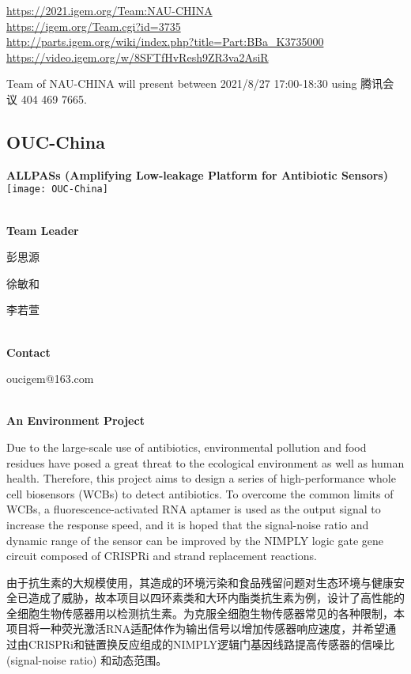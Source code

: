 \url{https://2021.igem.org/Team:NAU-CHINA }\\
\url{https://igem.org/Team.cgi?id=3735 }\\
\url{http://parts.igem.org/wiki/index.php?title=Part:BBa_K3735000 }\\
\url{https://video.igem.org/w/8SFTfHvResh9ZR3va2AsiR }\\

\vfill{}









Team of NAU-CHINA will present between   2021/8/27 17:00-18:30      using 腾讯会议 404 469 7665.
\newpage


\subsection{\textcolor{Blu}{ OUC-China } }
\vspace{5mm}
\begin{center}
\large{
  \textbf{ ALLPASs (Amplifying Low-leakage Platform for Antibiotic Sensors) }\\
  \texttt{[image: OUC-China]}
}
\end{center}
\textbf{\\Team Leader}

  彭思源

  徐敏和

  李若萱


\textbf{\\Contact}

  oucigem@163.com

\textbf{\\An Environment Project\\}\begin{spacing}{1.5}

Due to the large-scale use of antibiotics, environmental pollution and food residues have posed a great threat to the ecological environment as well as human health. Therefore, this project aims to design a series of high-performance whole cell biosensors (WCBs) to detect antibiotics. To overcome the common limits of WCBs, a fluorescence-activated RNA aptamer is used as the output signal to increase the response speed, and it is hoped that the signal-noise ratio and dynamic range of the sensor can be improved by the NIMPLY logic gate gene circuit composed of CRISPRi and strand replacement reactions.

由于抗生素的大规模使用，其造成的环境污染和食品残留问题对生态环境与健康安全已造成了威胁，故本项目以四环素类和大环内酯类抗生素为例，设计了高性能的全细胞生物传感器用以检测抗生素。为克服全细胞生物传感器常见的各种限制，本项目将一种荧光激活RNA适配体作为输出信号以增加传感器响应速度，并希望通过由CRISPRi和链置换反应组成的NIMPLY逻辑门基因线路提高传感器的信噪比 (signal-noise ratio) 和动态范围。\end{spacing}
\\

